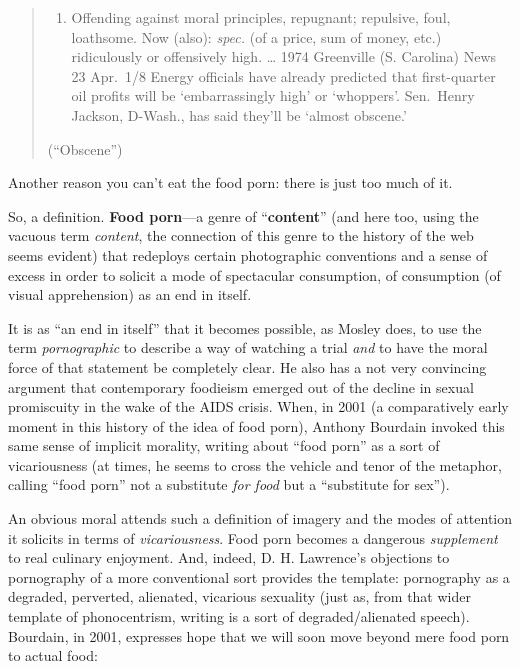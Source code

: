 \documentclass[
  12pt,
]{article}
\providecommand{\tightlist}{%
  \setlength{\itemsep}{0pt}\setlength{\parskip}{0pt}}
\begin{document}
\begin{quote}
\begin{enumerate}
\def\labelenumi{\arabic{enumi}.}
\setcounter{enumi}{1}
\tightlist
\item
  Offending against moral principles, repugnant; repulsive, foul,
  loathsome. Now (also): \emph{spec.} (of a price, sum of money, etc.)
  ridiculously or offensively high. \ldots{} 1974 Greenville (S.
  Carolina) News 23 Apr.~1/8 Energy officials have already predicted
  that first-quarter oil profits will be `embarrassingly high' or
  `whoppers'. Sen.~Henry Jackson, D-Wash., has said they'll be `almost
  obscene.'
\end{enumerate}

(``Obscene'')
\end{quote}

Another reason you can't eat the food porn: there is just too much of
it.

So, a definition. \textbf{Food porn}---a genre of ``\textbf{content}''
(and here too, using the vacuous term \emph{content}, the connection of
this genre to the history of the web seems evident) that redeploys
certain photographic conventions and a sense of excess in order to
solicit a mode of spectacular consumption, of consumption (of visual
apprehension) as an end in itself.

It is as ``an end in itself'' that it becomes possible, as Mosley does,
to use the term \emph{pornographic} to describe a way of watching a
trial \emph{and} to have the moral force of that statement be completely
clear. {He also has a not very convincing argument that contemporary
foodieism emerged out of the decline in sexual promiscuity in the wake
of the AIDS crisis.} When, in 2001 (a comparatively early moment in this
history of the idea of food porn), Anthony Bourdain invoked this same
sense of implicit morality, writing about ``food porn'' as a sort of
vicariousness (at times, he seems to cross the vehicle and tenor of the
metaphor, calling ``food porn'' not a substitute \emph{for food} but a
``substitute for sex'').

An obvious moral attends such a definition of imagery and the modes of
attention it solicits in terms of \emph{vicariousness}. Food porn
becomes a dangerous \emph{supplement} to real culinary enjoyment. {And,
indeed, D. H. Lawrence's objections to pornography of a more
conventional sort provides the template: pornography as a degraded,
perverted, alienated, vicarious sexuality (just as, from that wider
template of phonocentrism, writing is a sort of degraded/alienated
speech).} Bourdain, in 2001, expresses hope that we will soon move
beyond mere food porn to actual food:
\end{document}
